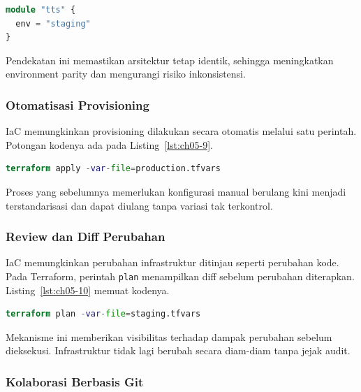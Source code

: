 \begin{lstlisting}[language=terraform, caption={Potongan kode Terraform pada Konsistensi Antar Environment}, label={lst:ch05-8}]
module "tts" {
  env = "staging"
}
\end{lstlisting}

Pendekatan ini memastikan arsitektur tetap identik, sehingga meningkatkan environment parity dan mengurangi risiko inkonsistensi.

\subsubsection*{Otomatisasi Provisioning}

IaC memungkinkan provisioning dilakukan secara otomatis melalui satu perintah. Potongan kodenya ada pada Listing~\ref{lst:ch05-9}.

\begin{lstlisting}[language=terraform, caption={Potongan kode Terraform pada Otomatisasi Provisioning}, label={lst:ch05-9}]
terraform apply -var-file=production.tfvars
\end{lstlisting}

Proses yang sebelumnya memerlukan konfigurasi manual berulang kini menjadi terstandarisasi dan dapat diulang tanpa variasi tak terkontrol.

\subsubsection*{Review dan Diff Perubahan}

IaC memungkinkan perubahan infrastruktur ditinjau seperti perubahan kode. Pada Terraform, perintah \texttt{plan} menampilkan diff sebelum perubahan diterapkan. Listing~\ref{lst:ch05-10} memuat kodenya.

\begin{lstlisting}[language=terraform, caption={Potongan kode Terraform pada Review dan Diff Perubahan}, label={lst:ch05-10}]
terraform plan -var-file=staging.tfvars
\end{lstlisting}

Mekanisme ini memberikan visibilitas terhadap dampak perubahan sebelum dieksekusi. Infrastruktur tidak lagi berubah secara diam-diam tanpa jejak audit.

\subsubsection*{Kolaborasi Berbasis Git}

